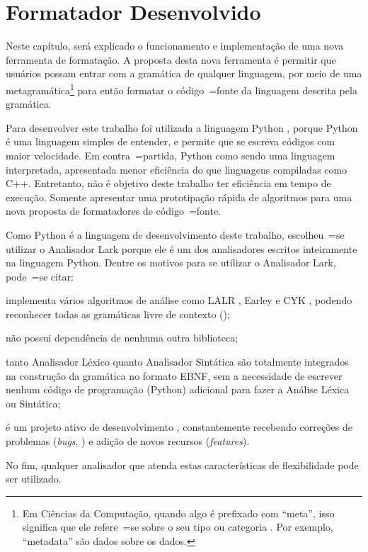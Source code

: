 

\chapter{Formatador Desenvolvido}
\label{chapter:software_implementation}

Neste capítulo,
será explicado o funcionamento e
implementação de uma nova ferramenta de formatação.
A proposta desta nova ferramenta é permitir que usuários possam entrar com a gramática de qualquer linguagem,
por meio de uma metagramática\footnote{
Em Ciências da Computação,
quando algo é prefixado com ``meta'',
isso significa que ele refere~=se sobre o seu tipo ou
categoria \cite{theUseOfMetaRules}.
Por exemplo,
``metadata'' são dados sobre os dados.
} para então formatar o código~=fonte da linguagem descrita pela gramática.

Para desenvolver este trabalho foi utilizada a linguagem Python \cite{webDevelopmentWithDjango},
porque Python é uma linguagem simples de entender,
e permite que se escreva códigos com maior velocidade.
Em contra~=partida,
Python como sendo uma linguagem interpretada,
apresentada menor eficiência do que linguagens compiladas como C++.
Entretanto,
não é objetivo deste trabalho ter eficiência em tempo de execução.
Somente apresentar uma prototipação rápida de algoritmos para uma nova proposta de formatadores de código~=fonte.

Como Python é a linguagem de desenvolvimento deste trabalho,
escolheu~=se utilizar o Analisador Lark porque ele é um dos analisadores escritos inteiramente na linguagem Python.
Dentre os motivos para se utilizar o Analisador Lark,
pode~=se citar:
\begin{inparaenum}[1)]
\item implementa vários algoritmos de análise como LALR \cite{lalrDeRemer1982},
Earley \cite{JayEarley} e CYK \cite{hopcroftBook},
podendo reconhecer todas as gramáticas livre de contexto ();
\item não possui dependência de nenhuma outra biblioteca;
\item tanto Analisador Léxico quanto Analisador Sintática são totalmente integrados na construção da gramática no formato EBNF,
sem a necessidade de escrever nenhum código de programação (Python) adicional para fazer a Análise Léxica ou
Sintática;
\item é um projeto ativo de desenvolvimento \cite{larkCommitHistory},
constantemente recebendo correções de problemas (\textit{bugs},
) e
adição de novos recursos (\textit{features}).
\end{inparaenum}%
No fim,
qualquer analisador que atenda estas características de flexibilidade pode ser utilizado.

